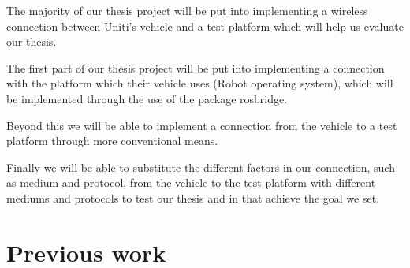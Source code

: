 \documentclass[a4paper]{article}
\begin{document}

The majority of our thesis project will be put into implementing a wireless
connection between Uniti's vehicle and a test platform which will help us
evaluate our thesis.

The first part of our thesis project will be put into implementing a connection
with the platform which their vehicle uses (Robot operating system), which will
be implemented through the use of the package rosbridge.

Beyond this we will be able to implement a connection from the vehicle to a test
platform through more conventional means.

Finally we will be able to substitute the different factors in our connection,
such as medium and protocol, from the vehicle to the test platform with
different mediums and protocols to test our thesis and in that achieve the goal
we set.



\section{Previous work}


\end{document}
